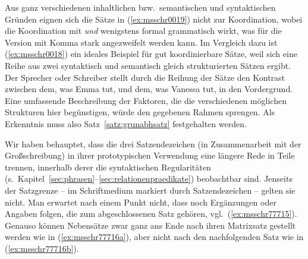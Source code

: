 \begin{exe}
  \ex\label{ex:msschr0019} 
  \begin{xlist}
  \end{xlist}
\end{exe}

Aus ganz verschiedenen inhaltlichen bzw.\ semantischen und syntaktischen Gründen eignen sich die Sätze in (\ref{ex:msschr0019}) nicht zur Koordination, wobei die Koordination mit \textit{und} wenigstens formal grammatisch wirkt, was für die Version mit Komma stark angezweifelt werden kann.
Im Vergleich dazu ist (\ref{ex:msschr0018}) ein ideales Beispiel für gut koordinierbare Sätze, weil sich eine Reihe aus zwei syntaktisch und semantisch gleich strukturierten Sätzen ergibt.
Der Sprecher oder Schreiber stellt durch die Reihung der Sätze den Kontrast zwischen dem, was Emma tut, und dem, was Vanessa tut, in den Vordergrund.
Eine umfassende Beschreibung der Faktoren, die die verschiedenen möglichen Strukturen hier begünstigen, würde den gegebenen Rahmen sprengen.
Als Erkenntnis muss also Satz~\ref{satz:grunabhsatz} festgehalten werden.


Wir haben behauptet, dass die drei Satzendezeichen (in Zusammenarbeit mit der Großschreibung) in ihrer prototypischen Verwendung eine längere Rede in Teile trennen, innerhalb derer die syntaktischen Regularitäten (s.\ Kapitel~\ref{sec:phrasen}--\ref{sec:relationenpraedikate}) beobachtbar sind.
Jenseits der Satzgrenze -- im Schriftmedium markiert durch Satzendezeichen -- gelten sie nicht.
Man erwartet \zB nach einem Punkt nicht, dass noch Ergänzungen oder Angaben folgen, die zum abgeschlossenen Satz gehören, vgl.\ (\ref{ex:msschr77715}).
Genauso können Nebensätze zwar ganz ans Ende nach ihren Matrixsatz gestellt werden wie in (\ref{ex:msschr77716a}), aber nicht nach den nachfolgenden Satz wie in (\ref{ex:msschr77716b}).

\begin{exe}
  \ex\label{ex:msschr77716}
  \begin{xlist}
  \end{xlist}
\end{exe}

